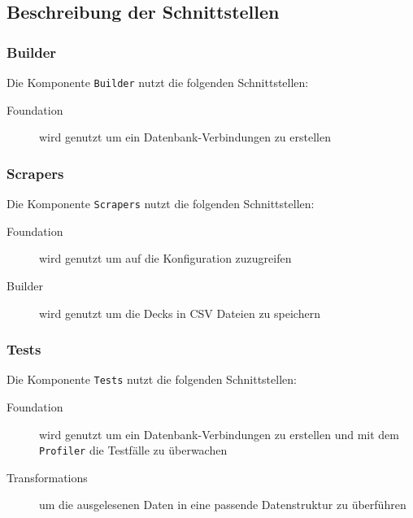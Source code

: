 \subsection{Beschreibung der Schnittstellen}
\subsubsection*{Builder}
Die Komponente \verb|Builder| nutzt die folgenden Schnittstellen:
\begin{description}
    \item[Foundation] wird genutzt um ein Datenbank-Verbindungen zu erstellen
\end{description}

\subsubsection*{Scrapers}
Die Komponente \verb|Scrapers| nutzt die folgenden Schnittstellen:
\begin{description}
    \item[Foundation] wird genutzt um auf die Konfiguration zuzugreifen
    
    \item[Builder] wird genutzt um die Decks in \ac{CSV} Dateien zu speichern
\end{description}

\subsubsection*{Tests}
Die Komponente \verb|Tests| nutzt die folgenden Schnittstellen:
\begin{description}
    \item[Foundation] wird genutzt um ein Datenbank-Verbindungen zu erstellen und mit dem \verb|Profiler| die Testfälle zu überwachen
    
    \item[Transformations] um die ausgelesenen Daten in eine passende Datenstruktur zu überführen
\end{description}
